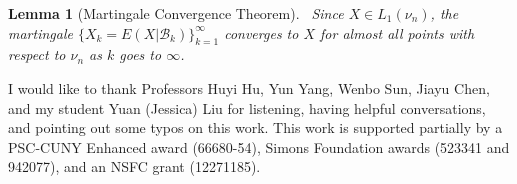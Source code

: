 \documentclass[11pt]{amsart}
\newtheorem{lemma}{Lemma}
\theoremstyle{definition}
\def\B{\mathcal{B}}
\begin{document}
 
 \medskip
 \begin{lemma}[Martingale Convergence Theorem]~\label{mct}
 Since $X\in L_{1}(\nu_{n})$, the martingale $\{X_{k}=E(X|\B_{k})\}_{k=1}^{\infty}$ converges to $X$ for almost all points with respect to $\nu_{n}$ as $k$ goes to $\infty$.  
 \end{lemma}


\medskip
\medskip

 I would like to thank Professors Huyi Hu, Yun Yang, Wenbo Sun, Jiayu Chen, and my student Yuan (Jessica) Liu for listening, having helpful conversations, and pointing out 
some typos on this work. 
This work is supported partially by a PSC-CUNY Enhanced award (66680-54), Simons Foundation awards (523341 and
942077), and an NSFC grant (12271185).

\medskip
\end{document}

